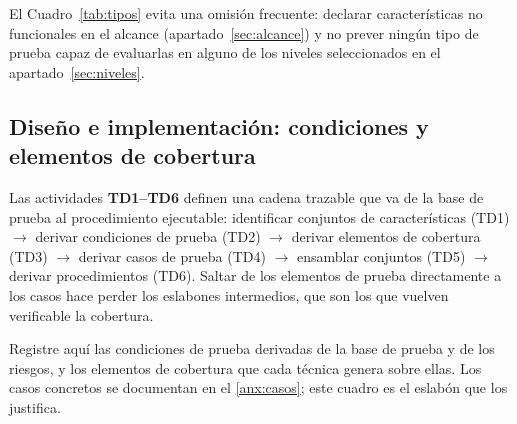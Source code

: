El Cuadro~\ref{tab:tipos} evita una omisión frecuente: declarar características no funcionales
en el alcance (apartado~\ref{sec:alcance}) y no prever ningún tipo de prueba capaz de
evaluarlas en alguno de los niveles seleccionados en el apartado~\ref{sec:niveles}.

\subsection{Diseño e implementación: condiciones y elementos de cobertura}
\label{sec:diseno}

\begin{notanormativa}
Las actividades \textbf{TD1–TD6} definen una cadena trazable que va de la base de prueba al
procedimiento ejecutable: identificar conjuntos de características (TD1) $\rightarrow$ derivar
condiciones de prueba (TD2) $\rightarrow$ derivar elementos de cobertura (TD3) $\rightarrow$
derivar casos de prueba (TD4) $\rightarrow$ ensamblar conjuntos (TD5) $\rightarrow$ derivar
procedimientos (TD6). Saltar de los elementos de prueba directamente a los casos hace perder
los eslabones intermedios, que son los que vuelven verificable la cobertura.
\end{notanormativa}

\begin{observacion}
\end{observacion}

\begin{instruccion}
Registre aquí las condiciones de prueba derivadas de la base de prueba y de los riesgos, y los
elementos de cobertura que cada técnica genera sobre ellas. Los casos concretos se documentan
en el \ref{anx:casos}; este cuadro es el eslabón que los justifica.
\end{instruccion}

